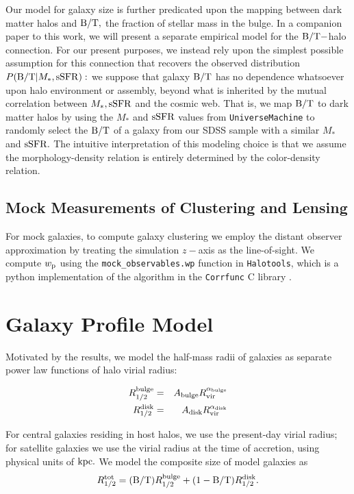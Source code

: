 \documentclass[usenatbib,usegraphicx,letterpaper]{mn2e}
\newcommand{\beq}{\begin{equation}}
\newcommand{\eeq}{\end{equation}}
\newcommand{\rhalftot}{R^{\rm tot}_{1/2}}
\newcommand{\rhalfdisk}{R_{1/2}^{\rm disk}}
\newcommand{\rhalfbulge}{R_{1/2}^{\rm bulge}}
\newcommand{\adisk}{A_{\rm disk}}
\newcommand{\abulge}{A_{\rm bulge}}
\newcommand{\alphadisk}{\alpha_{\rm disk}}
\newcommand{\alphabulge}{\alpha_{\rm bulge}}
\newcommand{\rvir}{R_{\rm vir}}
\newcommand{\bt}{{\rm B/T}}
\newcommand{\mstar}{M_{\ast}}
\newcommand{\ssfr}{{\rm sSFR}}
\newcommand{\wproj}{w_{\rm p}}
\newcommand{\kpc}{{\rm kpc}}
\begin{document}
Our model for galaxy size is further predicated upon the mapping between dark matter halos and $\bt,$ the fraction of stellar mass in the bulge. In a companion paper to this work, we will present a separate empirical model for the $\bt-$halo connection. For our present purposes, we instead rely upon the simplest possible assumption for this connection that recovers the observed distribution $P(\bt\vert\mstar,\ssfr):$ we suppose that galaxy $\bt$ has no dependence whatsoever upon halo environment or assembly, beyond what is inherited by the mutual correlation between $\mstar, \ssfr$ and the cosmic web. That is, we map $\bt$ to dark matter halos by using the $\mstar$ and $\ssfr$ values from {\tt UniverseMachine} to randomly select the $\bt$ of a galaxy from our SDSS sample with a similar $\mstar$ and $\ssfr.$ The intuitive interpretation of this modeling choice is that we assume the morphology-density relation is entirely determined by the color-density relation.

\subsection{Mock Measurements of Clustering and Lensing}
\label{subsec:mock_measurements}

For mock galaxies, to compute galaxy clustering we employ the distant observer approximation by treating the simulation $z-$axis as the line-of-sight. We compute $\wproj$ using the {\tt mock\_observables.wp} function in {\tt Halotools}, which is a python implementation of the algorithm in the {\tt Corrfunc} C library \citep{sinha_etal17}.


\section{Galaxy Profile Model}
\label{sec:model}

Motivated by the \citet{kravtsov13} results, we model the half-mass radii of galaxies as separate power law functions of halo virial radius:

\begin{eqnarray}
\label{eq:fiducial_model}
\rhalfbulge &=& \abulge\rvir^{\alphabulge} \\
\rhalfdisk &=& \adisk\rvir^{\alphadisk}
\end{eqnarray}

For central galaxies residing in host halos, we use the present-day virial radius; for satellite galaxies we use the virial radius at the time of accretion, using physical units of $\kpc.$ We model the composite size of model galaxies as
\beq
\rhalftot = (\bt)\rhalfbulge + (1-\bt)\rhalfdisk.
\eeq
\end{document}
